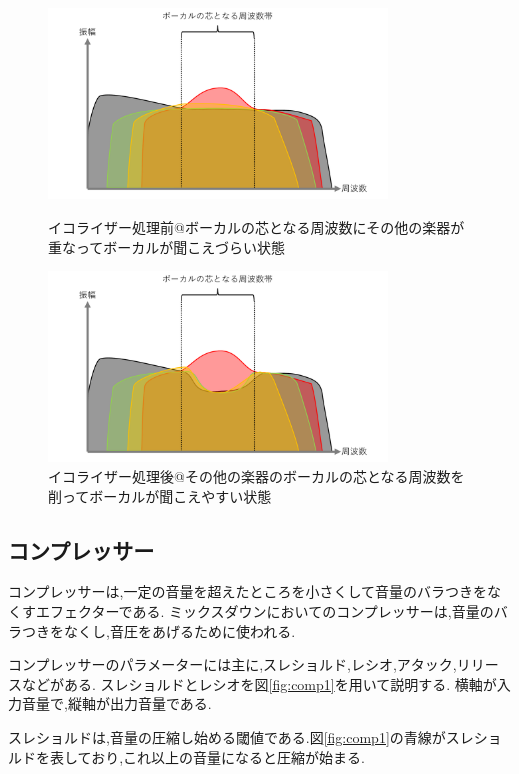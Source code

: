 \documentclass[12pt,a4j,titlepage]{ltjsarticle}
\begin{document}
\begin{figure}[H]
  \begin{minipage}[b]{0.5\linewidth}
    \centering
    \includegraphics[width=90mm]{./figures/EQ1.pdf}
    \caption{イコライザー処理前@ボーカルの芯となる周波数にその他の楽器が重なってボーカルが聞こえづらい状態}
    \label{fig:EQ1}
  \end{minipage}
  \begin{minipage}[b]{0.5\linewidth}
    \centering
    \includegraphics[width=90mm]{./figures/EQ2.pdf}
    \caption{イコライザー処理後@その他の楽器のボーカルの芯となる周波数を削ってボーカルが聞こえやすい状態}
    \label{fig:EQ2}
  \end{minipage}
\end{figure}

\subsection{コンプレッサー}
コンプレッサーは,一定の音量を超えたところを小さくして音量のバラつきをなくすエフェクターである.
ミックスダウンにおいてのコンプレッサーは,音量のバラつきをなくし,音圧をあげるために使われる.

コンプレッサーのパラメーターには主に,スレショルド,レシオ,アタック,リリースなどがある.
スレショルドとレシオを図\ref{fig:comp1}を用いて説明する.
横軸が入力音量で,縦軸が出力音量である.

スレショルドは,音量の圧縮し始める閾値である.図\ref{fig:comp1}の青線がスレショルドを表しており,これ以上の音量になると圧縮が始まる.
\end{document}
